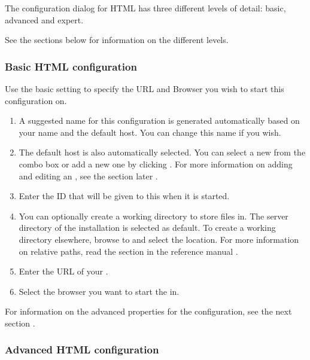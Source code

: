 

The \gdaut{} configuration dialog for HTML has three different levels of detail: basic, advanced and expert. 

See the sections below for information on the different levels. 

\subsubsection{Basic HTML \gdaut{} configuration}

Use the basic setting to specify the URL and Browser you wish to start this \gdaut{} configuration on. 

\begin{enumerate}
\item A suggested name for this \gdaut{} configuration is generated automatically based on your \gdaut{} name and the default \gdagent{} host. You can change this name if you wish. 
\item The default \gdagent host is also automatically selected. You can select a new \gdagent{} from the combo box or add a new one by clicking . For more information on adding and editing an \gdagent{}, see the section later .
\item Enter the \gdaut{} ID that will be given to this \gdaut{} when it is started.  
\item You can optionally create a working directory to store files in. The server directory of the \app{} installation is selected as default. To create a working directory elsewhere, browse to and select the location.  For more information on relative paths, read the section in the reference manual . 
\item Enter the URL of your \gdaut{}.
\item Select the browser you want to start the \gdaut{} in.
\end{enumerate}
For information on the advanced properties for the \gdaut{} configuration, see the next section . 

\subsubsection{Advanced HTML \gdaut{} configuration}
\label{AdvancedAUTConfigHTML}


